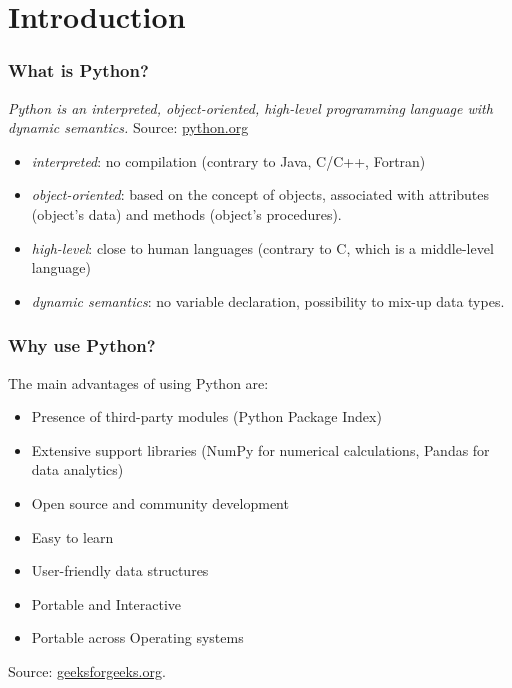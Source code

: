 \section{Introduction}

\begin{frame}[fragile]

\frametitle{What is Python?}

\emph{Python is an interpreted, object-oriented, high-level programming language with dynamic semantics.} Source: \href{https://www.python.org/doc/essays/blurb/}{python.org}

\begin{itemize}
\item \emph{interpreted}: no compilation (contrary to Java, C/C++, Fortran)
\item \emph{object-oriented}: based on the concept of objects, associated with attributes (object's data) and methods (object's procedures).
\item \emph{high-level}: close to human languages (contrary to C, which is a middle-level language)
\item \emph{dynamic semantics}: no variable declaration, possibility to mix-up data types.
\end{itemize}
\end{frame}

\begin{frame}[fragile]
\frametitle{Why use Python?}

The main advantages of using Python are:

\begin{itemize}
\item Presence of third-party modules (Python Package Index)
\item Extensive support libraries (NumPy for numerical calculations, Pandas for data analytics)
\item Open source and community development
\item Easy to learn
\item User-friendly data structures
\item Portable and Interactive
\item Portable across Operating systems
\end{itemize}

Source: \href{https://www.geeksforgeeks.org/python-language-advantages-applications/}{geeksforgeeks.org}.

\end{frame}

